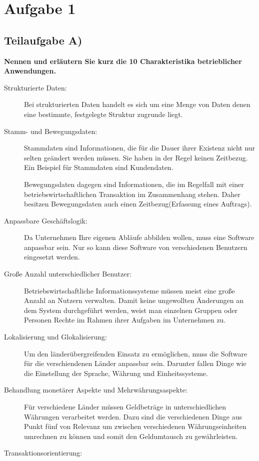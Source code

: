 \section{Aufgabe 1}

\subsection{Teilaufgabe A)}
\textbf{Nennen und erläutern Sie kurz die 10 Charakteristika betrieblicher
Anwendungen.}

\begin{description}
  \item[Strukturierte Daten:]
  Bei strukturierten Daten handelt es sich um eine Menge von Daten denen eine
  bestimmte, festgelegte Struktur zugrunde liegt.
  \item[Stamm- und Bewegungsdaten:]
  
  Stammdaten sind Informationen, die für die Dauer ihrer Existenz nicht \bzw nur selten geändert werden müssen. Sie haben
  in der Regel keinen Zeitbezug.
  Ein Beispiel für Stammdaten sind Kundendaten.
  
  Bewegungsdaten dagegen sind Informationen, die im Regelfall mit einer
  betriebswirtschaftlichen Transaktion im Zusammenhang stehen. Daher besitzen
  Bewegungsdaten auch einen Zeitbezug(\zB Erfassung eines Auftrags).
  \item[Anpassbare Geschäftslogik:]
  
  Da Unternehmen Ihre eigenen Abläufe abbilden wollen, muss eine Software anpassbar sein. Nur so kann diese Software von
  verschiedenen Benutzern eingesetzt werden.
  \item[Große Anzahl unterschiedlicher Benutzer:]
  
  Betriebswirtschaftliche Informationssysteme müssen meist eine große Anzahl an Nutzern verwalten. Damit
  keine ungewollten Änderungen an dem System durchgeführt werden, weist man
  einzelnen Gruppen oder Personen Rechte im Rahmen ihrer Aufgaben im Unternehmen
  zu.
  \item[Lokalisierung und Glokalisierung:]
  
  Um den länderübergreifenden Einsatz zu ermöglichen, muss die Software für die verschiendenen Länder anpassbar sein.
  Darunter fallen Dinge wie die Einstellung der Sprache, Währung und
  Einheitssysteme.
  \item[Behandlung monetärer Aspekte und Mehrwährungsaspekte:]
  
  Für verschiedene Länder müssen Geldbeträge in unterschiedlichen Währungen verarbeitet werden.
  Dazu sind die verschiedenen Dinge aus Punkt fünf von Relevanz um \zB zwischen
  verschiedenen Währungseinheiten umrechnen zu können und somit den Geldumtausch
  zu gewährleisten.
  \item[Transaktionsorientierung:]
  

\end{description}
